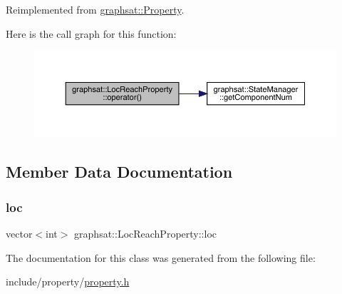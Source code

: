 Reimplemented from \mbox{\hyperlink{classgraphsat_1_1_property_a28a98381d3a2d2a7a67766d0ef90b30a}{graphsat\+::\+Property}}.

Here is the call graph for this function\+:\nopagebreak
\begin{figure}[H]
\begin{center}
\leavevmode
\includegraphics[width=350pt]{classgraphsat_1_1_loc_reach_property_a79c9d5f4ad6aa9ccf0033d1c5b06ddb8_cgraph}
\end{center}
\end{figure}


\subsection{Member Data Documentation}
\mbox{\label{classgraphsat_1_1_loc_reach_property_a1b5f1fc76dc16140d92bc1e6a12a1637}} 
\subsubsection{\texorpdfstring{loc}{loc}}
{\footnotesize\ttfamily vector$<$int$>$ graphsat\+::\+Loc\+Reach\+Property\+::loc\hspace{0.3cm}{\ttfamily [private]}}



The documentation for this class was generated from the following file\+:\begin{DoxyCompactItemize}
\item 
include/property/\mbox{\hyperlink{property_8h}{property.\+h}}\end{DoxyCompactItemize}
